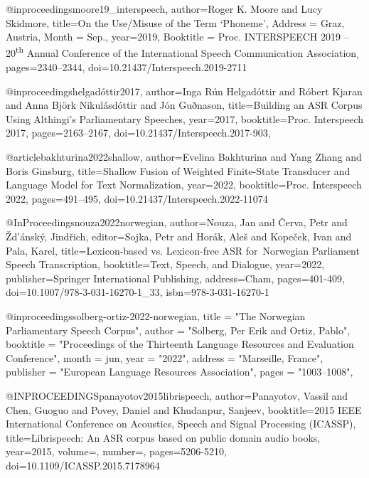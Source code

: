 @inproceedings{moore19_interspeech,
  author={Roger K. Moore and Lucy Skidmore},
  title={On the Use/Misuse of the Term {`Phoneme'}},
    Address = {{Graz, Austria}},
    Month = {{Sep.}},
  year=2019,
 	Booktitle = {Proc. {INTERSPEECH} 2019 -- 20\textsuperscript{th} Annual Conference of the International Speech Communication Association},
  pages={2340--2344},
  doi={10.21437/Interspeech.2019-2711}
}

@inproceedings{helgadóttir2017,
  author={Inga Rún Helgadóttir and Róbert Kjaran and Anna Björk Nikulásdóttir and Jón Guðnason},
  title={{Building an ASR Corpus Using Althingi’s Parliamentary Speeches}},
  year=2017,
  booktitle={Proc. Interspeech 2017},
  pages={2163--2167},
  doi={10.21437/Interspeech.2017-903},
}

@article{bakhturina2022shallow,
  author={Evelina Bakhturina and Yang Zhang and Boris Ginsburg},
  title={{Shallow Fusion of Weighted Finite-State Transducer and Language Model for Text Normalization}},
  year=2022,
  booktitle={Proc. Interspeech 2022},
  pages={491--495},
  doi={10.21437/Interspeech.2022-11074}
}

@InProceedings{nouza2022norwegian,
author={Nouza, Jan
and {\v{C}}erva, Petr
and {\v{Z}}d'{\'a}nsk{\'y}, Jind{\v{r}}ich},
editor={Sojka, Petr
and Hor{\'a}k, Ale{\v{s}}
and Kope{\v{c}}ek, Ivan
and Pala, Karel},
title={{Lexicon-based vs. Lexicon-free ASR for Norwegian Parliament Speech Transcription}},
booktitle={Text, Speech, and Dialogue},
year={2022},
publisher={Springer International Publishing},
address={Cham},
pages={401-409},
doi={10.1007/978-3-031-16270-1_33},
isbn={978-3-031-16270-1}
}

@inproceedings{solberg-ortiz-2022-norwegian,
    title = "The {N}orwegian {P}arliamentary {S}peech {C}orpus",
    author = "Solberg, Per Erik  and
      Ortiz, Pablo",
    booktitle = "Proceedings of the Thirteenth Language Resources and Evaluation Conference",
    month = jun,
    year = "2022",
    address = "Marseille, France",
    publisher = "European Language Resources Association",
    pages = "1003--1008",
}

@INPROCEEDINGS{panayotov2015librispeech,
  author={Panayotov, Vassil and Chen, Guoguo and Povey, Daniel and Khudanpur, Sanjeev},
  booktitle={2015 IEEE International Conference on Acoustics, Speech and Signal Processing (ICASSP)}, 
  title={{Librispeech: An ASR corpus based on public domain audio books}}, 
  year={2015},
  volume={},
  number={},
  pages={5206-5210},
  doi={10.1109/ICASSP.2015.7178964}
}

